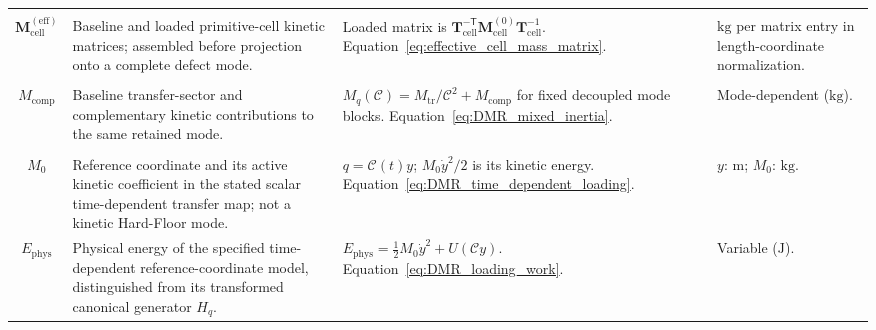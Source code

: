 \begin{longtable}{@{} c p{5.5cm} p{4cm} p{3.5cm} @{}}
\begin{tabular}[c]{@{}c@{}}$\mathbf M_{\mathrm{cell}}^{(0)}$ \\ $\mathbf M_{\mathrm{cell}}^{(\mathrm{eff})}$\end{tabular} & {\raggedright Baseline and loaded primitive-cell kinetic matrices; assembled before projection onto a complete defect mode.\par} & {\raggedright Loaded matrix is $\mathbf T_{\mathrm{cell}}^{-\mathsf T}\mathbf M_{\mathrm{cell}}^{(0)}\mathbf T_{\mathrm{cell}}^{-1}$. \newline Equation~\eqref{eq:effective_cell_mass_matrix}.\par} & {\raggedright $\mathrm{kg}$ per matrix entry in length-coordinate normalization.\par} \\

\begin{tabular}[c]{@{}c@{}}$M_{\mathrm{tr}}$ \\ $M_{\mathrm{comp}}$\end{tabular} & {\raggedright Baseline transfer-sector and complementary kinetic contributions to the same retained mode.\par} & {\raggedright $M_q(\mathcal C)=M_{\mathrm{tr}}/\mathcal C^2+M_{\mathrm{comp}}$ for fixed decoupled mode blocks. \newline Equation~\eqref{eq:DMR_mixed_inertia}.\par} & {\raggedright Mode-dependent ($\mathrm{kg}$).\par} \\

\begin{tabular}[c]{@{}c@{}}$y$ \\ $M_0$\end{tabular} & {\raggedright Reference coordinate and its active kinetic coefficient in the stated scalar time-dependent transfer map; not a kinetic Hard-Floor mode.\par} & {\raggedright $q=\mathcal C(t)y$; $M_0\dot y^2/2$ is its kinetic energy. \newline Equation~\eqref{eq:DMR_time_dependent_loading}.\par} & {\raggedright $y$: $\mathrm m$; $M_0$: $\mathrm{kg}$.\par} \\

$E_{\mathrm{phys}}$ & {\raggedright Physical energy of the specified time-dependent reference-coordinate model, distinguished from its transformed canonical generator $H_q$.\par} & {\raggedright $E_{\mathrm{phys}}=\tfrac12M_0\dot y^2+U(\mathcal C y)$. \newline Equation~\eqref{eq:DMR_loading_work}.\par} & {\raggedright Variable ($\mathrm J$).\par} \\


\end{longtable}
